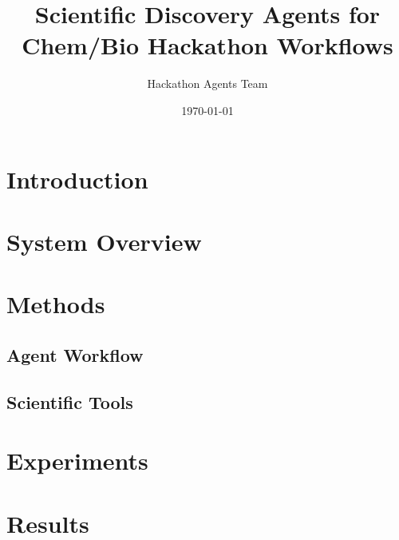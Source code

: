 \documentclass[11pt]{article}
\title{Scientific Discovery Agents for Chem/Bio Hackathon Workflows}
\author{Hackathon Agents Team}
\date{\today}
\begin{document}
\maketitle

\begin{abstract}
\end{abstract}

\section{Introduction}

\section{System Overview}

\section{Methods}

\subsection{Agent Workflow}

\subsection{Scientific Tools}

\section{Experiments}

\section{Results}
\end{document}
